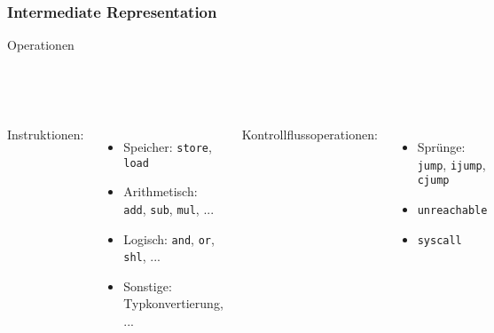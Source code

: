 \begin{frame}
    \frametitle{Intermediate Representation}{Operationen}
    \pause{}

    ~\\
    ~\\

    \begin{columns}[c]
        Instruktionen:
        \begin{itemize}
            \item Speicher: \texttt{store}, \texttt{load}
            \item Arithmetisch: \texttt{add}, \texttt{sub}, \texttt{mul}, ...
            \item Logisch: \texttt{and}, \texttt{or}, \texttt{shl}, ...
            \item Sonstige: Typkonvertierung, ...
        \end{itemize}

        \pause{}
        Kontrollflussoperationen:
        \begin{itemize}
            \item Sprünge: \texttt{jump}, \texttt{ijump}, \texttt{cjump}
            \item \texttt{unreachable}
            \item \texttt{syscall}
        \end{itemize}
    \end{columns}
\end{frame}


